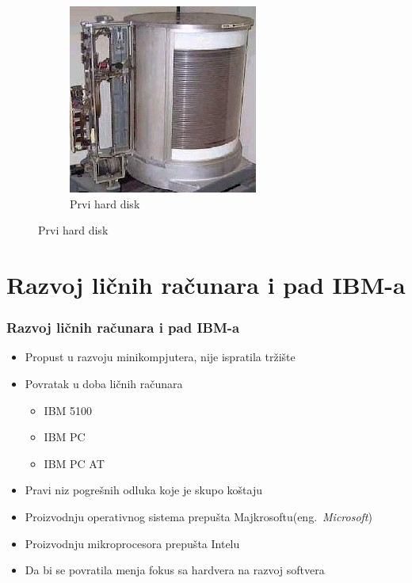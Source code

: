 \documentclass{beamer}
\begin{document}
\begin{frame}[fragile]
\begin{figure}[htb]
\begin{subfigure}{0.25\textwidth}
  \includegraphics[width=\linewidth]{ramac_hdd.jpg}
  \caption{Prvi hard disk}
  \label{fig:6}
\end{subfigure}
\label{fig:images}
\end{figure}
\end{frame}
\section{Razvoj ličnih računara i pad IBM-a}
\begin{frame}[fragile]\frametitle{Razvoj ličnih računara i pad IBM-a}
	\begin{itemize}
	\item Propust u razvoju minikompjutera, nije ispratila tržište
	\item Povratak u doba ličnih računara
	\begin{itemize}
	\item IBM 5100
	\item IBM PC
	\item IBM PC AT
	\end{itemize}
	\item Pravi niz pogrešnih odluka koje je skupo koštaju
	\item Proizvodnju operativnog sistema prepušta Majkrosoftu(eng.~{\em Microsoft})
	\item Proizvodnju mikroprocesora prepušta Intelu
	\item Da bi se povratila menja fokus sa hardvera na razvoj softvera
	\end{itemize}
\end{frame}
\end{document}
